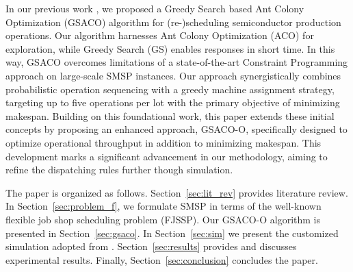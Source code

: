 In our previous work \cite{Ali2024}, we proposed a Greedy Search based Ant Colony Optimization (GSACO)
algorithm for (re-)scheduling semiconductor production operations. 
Our algorithm harnesses Ant Colony Optimization (ACO) \cite{Dorigo2019} for exploration, while
Greedy Search (GS) \cite{Papadimitriou} enables responses in short time. 
In this way, GSACO overcomes limitations of a state-of-the-art Constraint Programming approach \cite{Perron2023}
on large-scale SMSP instances. Our approach synergistically combines probabilistic operation sequencing with a greedy machine assignment strategy, targeting up to five operations per lot with the primary objective of minimizing makespan. Building on this foundational work, this paper extends these initial concepts by proposing an enhanced approach, GSACO-O, specifically designed to optimize operational throughput in addition to minimizing makespan. This development marks a significant advancement in our methodology, aiming to refine the dispatching rules further though simulation.

The paper is organized as follows. 
Section~\ref{sec:lit_rev} provides literature review.
In Section~\ref{sec:problem_f}, we formulate SMSP in terms of the well-known flexible job shop scheduling problem (FJSSP). 
Our GSACO-O algorithm is presented in Section~\ref{sec:gsaco}.
In Section~\ref{sec:sim} we present the customized simulation adopted from \cite{Kovacs2022}.
Section~\ref{sec:results} provides and discusses experimental results.
Finally, Section~\ref{sec:conclusion} concludes the paper.




